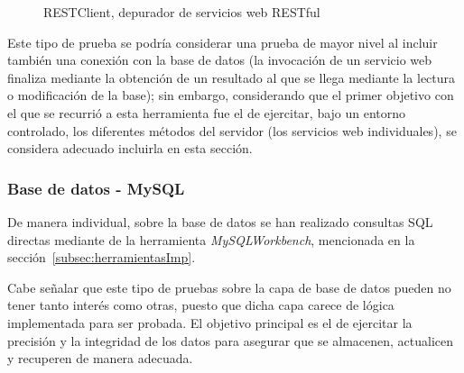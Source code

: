 \begin{figure}
	\centering
	\caption{RESTClient, depurador de servicios web RESTful}
	\label{fig:RESTClient}
\end{figure}

Este tipo de prueba se podría considerar una prueba de mayor nivel al incluir también una conexión con la base de datos (la invocación de un servicio web finaliza mediante la obtención de un resultado al que se llega mediante la lectura o modificación de la base); sin embargo, considerando que el primer objetivo con el que se recurrió a esta herramienta fue el de ejercitar, bajo un entorno controlado, los diferentes métodos del servidor (los servicios web individuales), se considera adecuado incluirla en esta sección.

\subsubsection{Base de datos - MySQL}

De manera individual, sobre la base de datos se han realizado consultas SQL directas mediante de la herramienta \emph{MySQLWorkbench}, mencionada en la sección~\ref{subsec:herramientasImp}. 

Cabe señalar que este tipo de pruebas sobre la capa de base de datos pueden no tener tanto interés como otras, puesto que dicha capa carece de lógica implementada para ser probada. El objetivo principal es el de ejercitar la precisión y la integridad de los datos para asegurar que se almacenen, actualicen y recuperen de manera adecuada.

